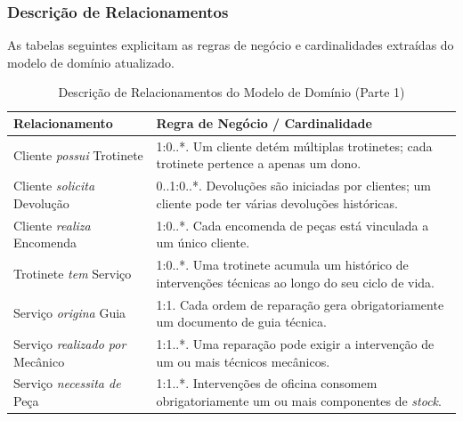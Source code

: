 \documentclass[a4paper,12pt]{scrreprt}
\begin{document}
    \subsubsection{Descrição de Relacionamentos}
    As tabelas seguintes explicitam as regras de negócio e cardinalidades extraídas do modelo de domínio atualizado. 
    \begin{table}[H]
        \centering
        \renewcommand{\arraystretch}{1.5}
        \begin{tabular}{|p{}|p{}|}
            \hline
            \rowcolor{gray!20} \textbf{Relacionamento} & \textbf{Regra de Negócio / Cardinalidade} \\ \hline
            Cliente \textit{possui} Trotinete & 1:0..*. Um cliente detém múltiplas trotinetes; cada trotinete pertence a apenas um dono. \\ \hline
            Cliente \textit{solicita} Devolução & 0..1:0..*. Devoluções são iniciadas por clientes; um cliente pode ter várias devoluções históricas. \\ \hline
            Cliente \textit{realiza} Encomenda & 1:0..*. Cada encomenda de peças está vinculada a um único cliente. \\ \hline
            Trotinete \textit{tem} Serviço & 1:0..*. Uma trotinete acumula um histórico de intervenções técnicas ao longo do seu ciclo de vida. \\ \hline
            Serviço \textit{origina} Guia & 1:1. Cada ordem de reparação gera obrigatoriamente um documento de guia técnica. \\ \hline
            Serviço \textit{realizado por} Mecânico & 1:1..*. Uma reparação pode exigir a intervenção de um ou mais técnicos mecânicos. \\ \hline
            Serviço \textit{necessita de} Peça & 1:1..*. Intervenções de oficina consomem obrigatoriamente um ou mais componentes de \textit{stock}. \\ \hline
        \end{tabular}
        \caption{Descrição de Relacionamentos do Modelo de Domínio (Parte 1)}
        \label{tab:rel_pt1}
    \end{table}
\end{document}
